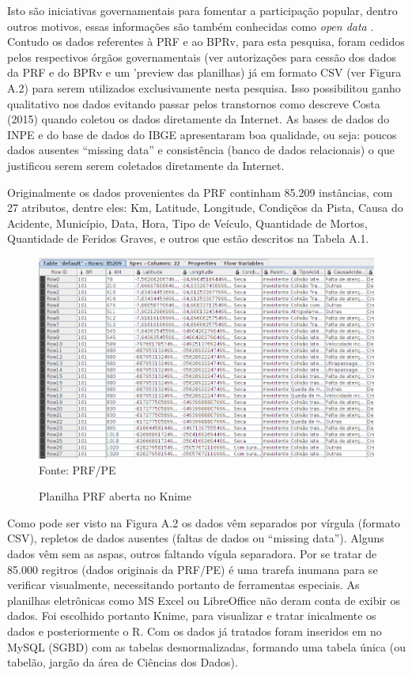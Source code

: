 Isto são iniciativas governamentais para fomentar a participação popular, dentro outros motivos, essas informações são também 
conhecidas como \textit{open data} \cite{DadosGoverno}. 
Contudo os dados referentes à PRF e ao BPRv, para esta pesquisa, foram cedidos pelos respectivos 
órgãos governamentais (ver autorizações para cessão dos dados da PRF e do BPRv e um 'preview das planilhas) já em formato CSV (ver Figura A.2) para serem utilizados exclusivamente nesta pesquisa. 
Isso possibilitou ganho qualitativo nos dados evitando 
passar pelos transtornos como descreve Costa (2015) quando coletou os dados diretamente da Internet.\cite{Costa2015} 
As bases de dados do INPE e do base de dados do IBGE apresentaram boa qualidade, ou seja: poucos dados ausentes ``missing data'' e consistência (banco de dados relacionais) o que justificou serem serem coletados diretamente da Internet.

Originalmente os dados provenientes da PRF continham 85.209 instâncias, com 27 atributos, dentre eles: Km, Latitude, Longitude, Condiçẽos da Pista, Causa do Acidente, Município, Data, Hora, Tipo de Veículo, Quantidade de Mortos, Quantidade de Feridos Graves, e outros que estão descritos na Tabela A.1.


\begin{figure}[ht!]
\centering
\caption{Planilha PRF aberta no Knime}
\includegraphics[width=0.9\linewidth]{Figuras/Anexos/PlanilhaPRF.png}
\label{fig:PreviaPlanilhaPRF}\\
\tiny Fonte: PRF/PE
\end{figure}

Como pode ser visto na Figura A.2 os dados vêm separados por vírgula (formato CSV), repletos de dados ausentes (faltas de dados ou ``missing data''). Alguns dados vêm sem as aspas, outros faltando vígula separadora. Por se tratar de 85.000 regitros (dados originais da PRF/PE) é uma trarefa inumana para se verificar visualmente, necessitando portanto de ferramentas especiais. As planilhas eletrônicas como MS Excel ou LibreOffice não deram conta de exibir os dados. Foi escolhido portanto Knime, para visualizar e tratar inicalmente os dados e posteriormente o R. Com os dados já tratados foram inseridos em no MySQL (SGBD) com as tabelas desnormalizadas, formando uma tabela única (ou tabelão, jargão da área de Ciências dos Dados).

